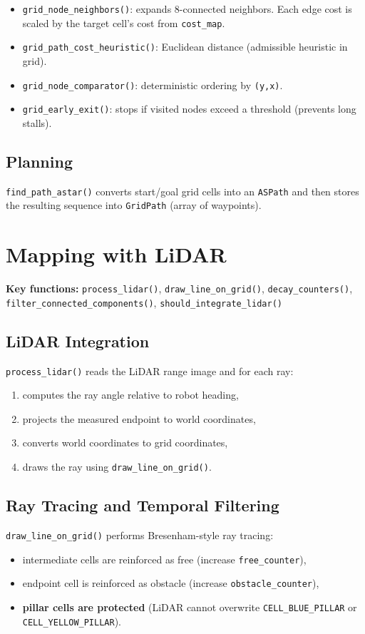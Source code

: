 \documentclass[12pt,a4paper]{article}
\begin{document}
\begin{itemize}[leftmargin=2em]
  \item \texttt{grid\_node\_neighbors()}: expands 8-connected neighbors. Each edge cost is scaled by the target cell's cost from \texttt{cost\_map}.
  \item \texttt{grid\_path\_cost\_heuristic()}: Euclidean distance (admissible heuristic in grid).
  \item \texttt{grid\_node\_comparator()}: deterministic ordering by \texttt{(y,x)}.
  \item \texttt{grid\_early\_exit()}: stops if visited nodes exceed a threshold (prevents long stalls).
\end{itemize}

\subsection{Planning}
\texttt{find\_path\_astar()} converts start/goal grid cells into an \texttt{ASPath} and then stores the resulting sequence into \texttt{GridPath} (array of waypoints).

\section{Mapping with LiDAR}
\textbf{Key functions:} \texttt{process\_lidar()}, \texttt{draw\_line\_on\_grid()},
\texttt{decay\_counters()}, \texttt{filter\_connected\_components()},
\texttt{should\_integrate\_lidar()}

\subsection{LiDAR Integration}
\texttt{process\_lidar()} reads the LiDAR range image and for each ray:
\begin{enumerate}[leftmargin=2em]
  \item computes the ray angle relative to robot heading,
  \item projects the measured endpoint to world coordinates,
  \item converts world coordinates to grid coordinates,
  \item draws the ray using \texttt{draw\_line\_on\_grid()}.
\end{enumerate}

\subsection{Ray Tracing and Temporal Filtering}
\texttt{draw\_line\_on\_grid()} performs Bresenham-style ray tracing:
\begin{itemize}[leftmargin=2em]
  \item intermediate cells are reinforced as free (increase \texttt{free\_counter}),
  \item endpoint cell is reinforced as obstacle (increase \texttt{obstacle\_counter}),
  \item \textbf{pillar cells are protected} (LiDAR cannot overwrite \texttt{CELL\_BLUE\_PILLAR} or \texttt{CELL\_YELLOW\_PILLAR}).
\end{itemize}
\end{document}
